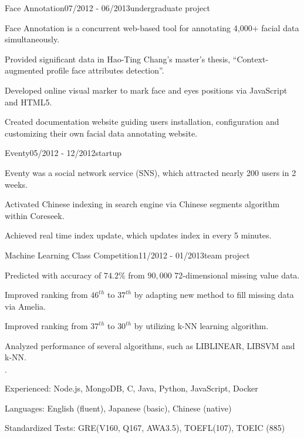 \documentclass{joel_cv}
\begin{document}
\begin{sectionContentNormal}{Face Annotation}{07/2012 - 06/2013}{undergraduate project}
  \item Face Annotation is a concurrent web-based tool for annotating 4,000+ facial data simultaneously.
  \item Provided significant data in Hao-Ting Chang’s master’s thesis, “Context-augmented profile face attributes detection”.
  \item Developed online visual marker to mark face and eyes positions via JavaScript and HTML5.  
  \item Created documentation website guiding users installation, configuration and customizing their own facial data annotating website. 
\end{sectionContentNormal}

\begin{sectionContentNormal}{Eventy}{05/2012 - 12/2012}{startup}
  \item Eventy was a social network service (SNS), which attracted nearly 200 users in 2 weeks.
  \item Activated Chinese indexing in search engine via Chinese segments algorithm within Coreseek.
  \item Achieved real time index update, which updates index in every 5 minutes.
\end{sectionContentNormal} 


\begin{sectionContentNormal}{Machine Learning Class Competition}{11/2012 - 01/2013}{team project}
  \item Predicted with accuracy of $74.2\%$ from $90,000$ 72-dimensional missing value data.
  \item Improved ranking from $46^{th}$ to $37^{th}$ by adapting new method to fill missing data via Amelia.
  \item Improved ranking from $37^{th}$ to $30^{th}$ by utilizing k-NN learning algorithm.
  \item Analyzed performance of several algorithms, such as LIBLINEAR, LIBSVM and k-NN.
\end{sectionContentNormal}

%
%

\begin{sectionItemize}{$\cdot$}
  \item Experienced: Node.js, MongoDB, C, Java, Python, JavaScript, Docker
  \item Languages: English (fluent), Japanese (basic), Chinese (native)
  \item Standardized Tests: GRE(V160, Q167, AWA3.5), TOEFL(107), TOEIC (885)
\end{sectionItemize}
\end{document}

